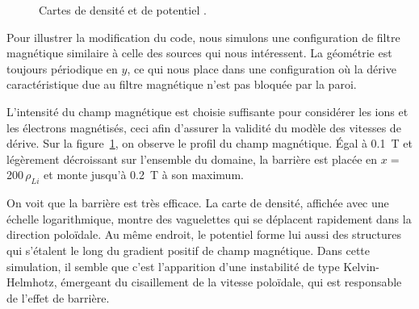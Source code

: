 \begin{refsection}
\begin{figure}[!htbp]
    \centering
    \caption{Cartes de densité  et de
    potentiel
    .}
    \label{2-CartesMagBarrier}
\end{figure}

Pour illustrer la modification du code, nous simulons une configuration de
filtre magnétique similaire à celle des sources qui nous intéressent. 
La géométrie est toujours périodique en $y$, ce qui nous place dans une
configuration où la dérive caractéristique due au filtre magnétique n'est pas
bloquée par la paroi.

L'intensité du champ
magnétique est choisie suffisante pour considérer les ions et les électrons
magnétisés, ceci afin d'assurer la validité du modèle des vitesses de dérive.
Sur la figure~\ref{2-CartesMagBarrier}, on observe le profil du champ
magnétique. Égal à 0.1~T et légèrement décroissant sur l'ensemble du domaine,
la barrière est placée en $x=\,$200$\,\rho_{Li}$ et monte jusqu'à 0.2~T à son maximum.

On voit que la barrière est très efficace. La carte de densité, affichée avec
une échelle logarithmique, montre des vaguelettes qui se déplacent rapidement
dans la direction poloïdale.
Au même endroit, le potentiel forme lui aussi des structures qui s'étalent le
long du gradient positif de champ magnétique. 
Dans cette simulation, il semble que c'est l'apparition d'une instabilité de
type Kelvin-Helmhotz, émergeant du cisaillement de la vitesse 
poloïdale, qui est responsable de l'effet de barrière.


\end{refsection}

